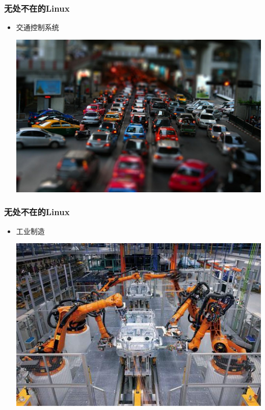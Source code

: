 \documentclass[xcolor=svgnames,presentation]{beamer}
\begin{document}
\begin{frame}
\frametitle{无处不在的Linux}
\label{sec-2-4-5}
\begin{itemize}

\item 交通控制系统
\label{sec-2-4-5-1}%
\begin{center}
\includegraphics[width=.9\linewidth]{img/traffic2.jpg}
\end{center}

\end{itemize} %
\end{frame}
\begin{frame}
\frametitle{无处不在的Linux}
\label{sec-2-4-6}
\begin{itemize}

\item 工业制造
\label{sec-2-4-6-1}%
\begin{center}
\includegraphics[width=.9\linewidth]{img/industry.jpg}
\end{center}

\end{itemize} %
\end{frame}
\end{document}
